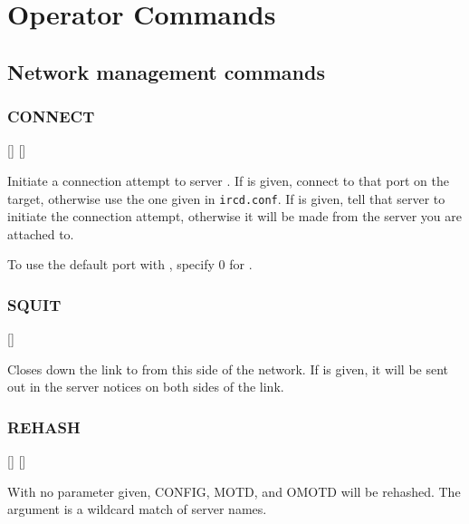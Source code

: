 \chapter{Operator Commands}
\label{commands}

\section{Network management commands}

\subsection{CONNECT}

     [] []

	Initiate a connection attempt to server . If
	 is given, connect to that port on the target,
	otherwise use the one given in \nolinkurl{ircd.conf}. If
	 is given, tell that server to initiate the
	connection attempt, otherwise it will be made from the server you
	are attached to.


	To use the default port with , specify 0 for
	.


\subsection{SQUIT}

     []

	Closes down the link to  from this side of the
	network. If  is given, it will be sent out in
	the server notices on both sides of the link.


\subsection{REHASH}

[] []

	With no parameter given, CONFIG, MOTD, and OMOTD will be rehashed. The
	 argument is a wildcard match of server names.


